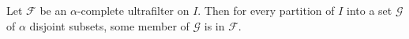 Let $\mathcal{F}$ be an $\alpha$-complete ultrafilter on $I$. Then for every partition of $I$ into a set $\mathcal{G}$ of $\alpha$ disjoint subsets, some member of $\mathcal{G}$ is in $\mathcal{F}$.

